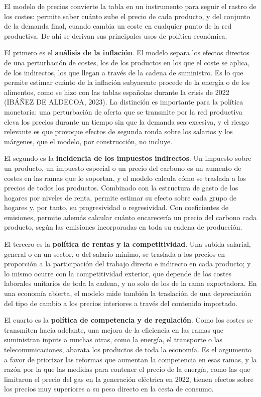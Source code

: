 \documentclass[10pt,a4paper]{article}
\begin{document}
El modelo de precios convierte la tabla en un instrumento para seguir el rastro de los costes: permite saber cuánto sube el precio de cada producto, y del conjunto de la demanda final, cuando cambia un coste en cualquier punto de la red productiva. De ahí se derivan sus principales usos de política económica.

El primero es el \textbf{análisis de la inflación}. El modelo separa los efectos directos de una perturbación de costes, los de los productos en los que el coste se aplica, de los indirectos, los que llegan a través de la cadena de suministro. Es lo que permite estimar cuánto de la inflación subyacente procede de la energía o de los alimentos, como se hizo con las tablas españolas durante la crisis de 2022 (IBÁÑEZ DE ALDECOA, 2023). La distinción es importante para la política monetaria: una perturbación de oferta que se transmite por la red productiva eleva los precios durante un tiempo sin que la demanda sea excesiva, y el riesgo relevante es que provoque efectos de segunda ronda sobre los salarios y los márgenes, que el modelo, por construcción, no incluye.

El segundo es la \textbf{incidencia de los impuestos indirectos}. Un impuesto sobre un producto, un impuesto especial o un precio del carbono es un aumento de costes en las ramas que lo soportan, y el modelo calcula cómo se traslada a los precios de todos los productos. Combinado con la estructura de gasto de los hogares por niveles de renta, permite estimar su efecto sobre cada grupo de hogares y, por tanto, su progresividad o regresividad. Con coeficientes de emisiones, permite además calcular cuánto encarecería un precio del carbono cada producto, según las emisiones incorporadas en toda su cadena de producción.

El tercero es la \textbf{política de rentas y la competitividad}. Una subida salarial, general o en un sector, o del salario mínimo, se traslada a los precios en proporción a la participación del trabajo directo e indirecto en cada producto; y lo mismo ocurre con la competitividad exterior, que depende de los costes laborales unitarios de toda la cadena, y no solo de los de la rama exportadora. En una economía abierta, el modelo mide también la traslación de una depreciación del tipo de cambio a los precios interiores a través del contenido importado.

El cuarto es la \textbf{política de competencia y de regulación}. Como los costes se transmiten hacia adelante, una mejora de la eficiencia en las ramas que suministran inputs a muchas otras, como la energía, el transporte o las telecomunicaciones, abarata los productos de toda la economía. Es el argumento a favor de priorizar las reformas que aumentan la competencia en esas ramas, y la razón por la que las medidas para contener el precio de la energía, como las que limitaron el precio del gas en la generación eléctrica en 2022, tienen efectos sobre los precios muy superiores a su peso directo en la cesta de consumo.
\end{document}
